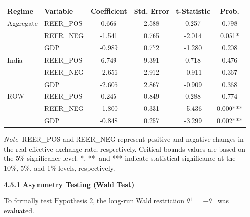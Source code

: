 \documentclass[12pt]{article}
\begin{document}
\begin{table}[htbp]
\begin{tabular}{llcccc}
\hline
Regime & Variable & Coefficient & Std. Error & t-Statistic & Prob. \\
\hline
Aggregate & REER\_POS & 0.666 & 2.588 & 0.257 & 0.798 \\
          & REER\_NEG & -1.541 & 0.765 & -2.014 & 0.051* \\
          & GDP      & -0.989 & 0.772 & -1.280 & 0.208 \\
\hline
India & REER\_POS & 6.749 & 9.391 & 0.718 & 0.476 \\
      & REER\_NEG & -2.656 & 2.912 & -0.911 & 0.367 \\
      & GDP      & -2.606 & 2.867 & -0.909 & 0.368 \\
\hline
ROW & REER\_POS & 0.245 & 0.849 & 0.288 & 0.774 \\
    & REER\_NEG & -1.800 & 0.331 & -5.436 & 0.000*** \\
    & GDP      & -0.848 & 0.257 & -3.299 & 0.002*** \\
\hline
\end{tabular}

\vspace{0.3cm}

\footnotesize
\textit{Note.} REER\_POS and REER\_NEG represent positive and negative changes in the real effective exchange rate, respectively. 
Critical bounds values are based on the 5\% significance level. 
*, **, and *** indicate statistical significance at the 10\%, 5\%, and 1\% levels, respectively. 

\end{table}

\vspace{0.5cm}
\noindent\textbf{4.5.1 Asymmetry Testing (Wald Test)}

To formally test Hypothesis 2, the long-run Wald restriction $\theta^{+} = -\theta^{-}$ was evaluated.
\end{document}
